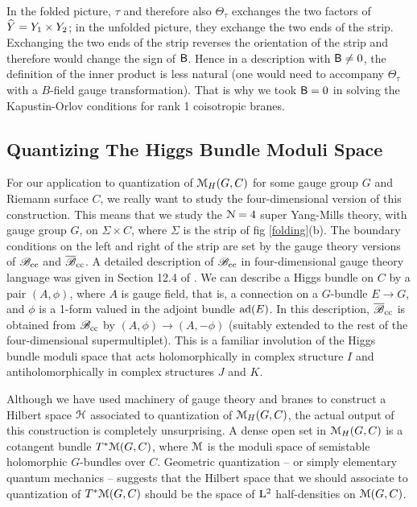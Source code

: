 \documentclass[11pt,a4paper]{article}
\begin{document}
  In the folded picture, $\tau$ and therefore also
 $\Theta_\tau$ exchanges the two factors of $\widehat Y=Y_1\times Y_2$; in the unfolded picture, they exchange the two ends of the strip.   Exchanging the
 two ends of the strip reverses the orientation of the strip and therefore would change the sign of ${\sf B}$.   Hence in a description with ${\sf B}\not=0$,
 the definition of the inner product is less natural (one would need to accompany $\Theta_\tau$ with a $B$-field gauge transformation).  That is why we took
 ${\sf B}=0$ in solving the Kapustin-Orlov conditions for rank 1 coisotropic branes.   
 

 
 
 \subsection{Quantizing The Higgs Bundle Moduli Space}\label{aphiggs}
 
 For our application to quantization of $ {\mathcal M}_H(G,C)$ for some gauge group $G$ and 
 Riemann surface $C$, we really want to study the four-dimensional
 version of this construction.   This means that we study the ${\mathcal N}=4$ super Yang-Mills theory, with gauge group $G$, on $\Sigma\times C$, where
 $\Sigma$ is the strip of fig \ref{folding}(b).   The boundary conditions on the left and right of the strip are set by the gauge theory versions of ${\mathscr B}_{\mathrm{cc}}$ and
 ${\overline {\mathscr B}}_{\mathrm{cc}}$.   A detailed description of ${\mathscr B}_{\mathrm{cc}}$ in four-dimensional gauge theory language was given in Section 12.4 of \cite{KW}.    We can describe
 a Higgs bundle on $C$ by a pair $(A,\phi)$, where $A$ is gauge field, that is, a connection on a $G$-bundle $E\to G$,
  and $\phi$ is a 1-form valued in the adjoint bundle ${\mathrm{ad}}(E)$.  In this description, ${\overline {\mathscr B}}_{\mathrm{cc}}$ is obtained from ${\mathscr B}_{\mathrm{cc}}$ by $(A,\phi)\to (A,-\phi)$ (suitably extended
  to the rest of the four-dimensional supermultiplet).     This is a familiar involution of the Higgs bundle moduli space that acts holomorphically in complex
  structure $I$ and antiholomorphically in complex structures $J$ and $K$.

Although we have used machinery of gauge theory and branes to construct a Hilbert space ${\mathcal H}$ associated to quantization of ${\mathcal M}_H(G,C)$,   the actual
output of this construction is completely unsurprising.  A dense open set in ${\mathcal M}_H(G,C)$ is a cotangent bundle $T^*{\mathcal M}(G,C)$, where ${\mathcal M}$ is the moduli
space of semistable holomorphic $G$-bundles over $C$.   Geometric quantization -- or simply elementary quantum mechanics -- suggests that the
Hilbert space that we should associate to quantization of $T^*{\mathcal M}(G,C)$ should be the space of ${\mathrm L}^2$ half-densities on ${\mathcal M}(G,C)$.    
\end{document}
